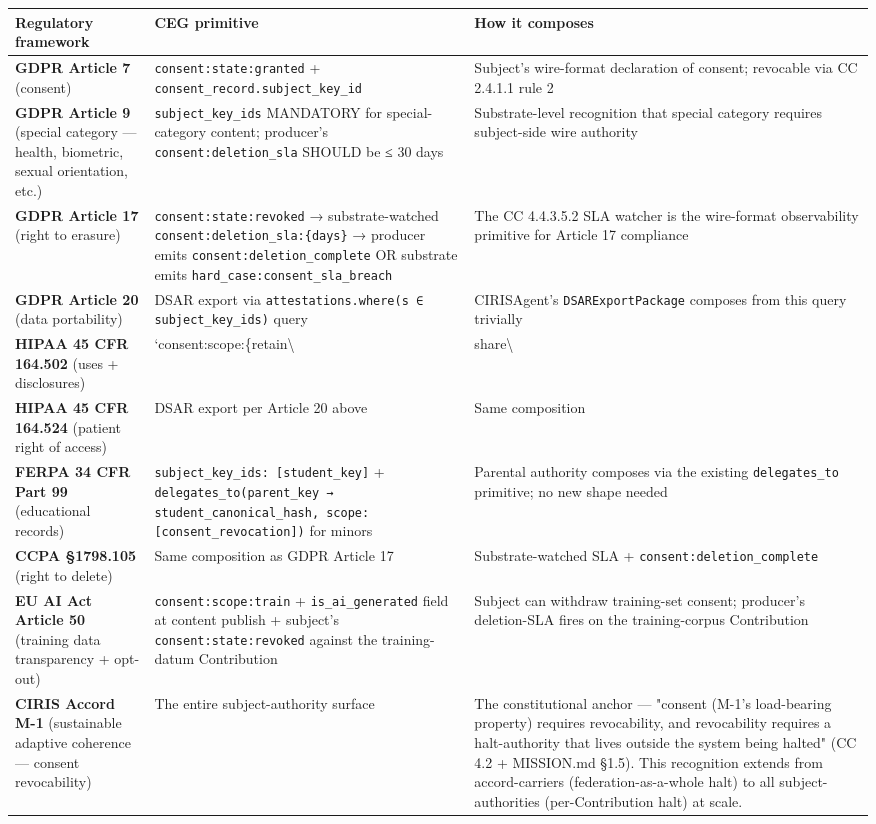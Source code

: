 \documentclass[11pt]{article}
\begin{document}
{\footnotesize
\begin{longtable}{|p{5.33cm}|p{5.33cm}|p{5.33cm}|}\hline
\textbf{Regulatory framework} & \textbf{CEG primitive} & \textbf{How it composes} \\ \hline\endhead
\textbf{GDPR Article 7} (consent) & \texttt{consent:state:granted} + \texttt{consent\_record.subject\_key\_id} & Subject's wire-format declaration of consent; revocable via CC 2.4.1.1 rule 2 \\ \hline
\textbf{GDPR Article 9} (special category — health, biometric, sexual orientation, etc.) & \texttt{subject\_key\_ids} MANDATORY for special-category content; producer's \texttt{consent:deletion\_sla} SHOULD be ≤ 30 days & Substrate-level recognition that special category requires subject-side wire authority \\ \hline
\textbf{GDPR Article 17} (right to erasure) & \texttt{consent:state:revoked} → substrate-watched \texttt{consent:deletion\_sla:\{days\}} → producer emits \texttt{consent:deletion\_complete} OR substrate emits \texttt{hard\_case:consent\_sla\_breach} & The CC 4.4.3.5.2 SLA watcher is the wire-format observability primitive for Article 17 compliance \\ \hline
\textbf{GDPR Article 20} (data portability) & DSAR export via \texttt{attestations.where(s ∈ subject\_key\_ids)} query & CIRISAgent's \texttt{DSARExportPackage} composes from this query trivially \\ \hline
\textbf{HIPAA 45 CFR 164.502} (uses + disclosures) & `consent:scope:\{retain\textbackslash{} & share\textbackslash{} \\ \hline
\textbf{HIPAA 45 CFR 164.524} (patient right of access) & DSAR export per Article 20 above & Same composition \\ \hline
\textbf{FERPA 34 CFR Part 99} (educational records) & \texttt{subject\_key\_ids: [student\_key]} + \texttt{delegates\_to(parent\_key → student\_canonical\_hash, scope: [consent\_revocation])} for minors & Parental authority composes via the existing \texttt{delegates\_to} primitive; no new shape needed \\ \hline
\textbf{CCPA §1798.105} (right to delete) & Same composition as GDPR Article 17 & Substrate-watched SLA + \texttt{consent:deletion\_complete} \\ \hline
\textbf{EU AI Act Article 50} (training data transparency + opt-out) & \texttt{consent:scope:train} + \texttt{is\_ai\_generated} field at content publish + subject's \texttt{consent:state:revoked} against the training-datum Contribution & Subject can withdraw training-set consent; producer's deletion-SLA fires on the training-corpus Contribution \\ \hline
\textbf{CIRIS Accord M-1} (sustainable adaptive coherence — consent revocability) & The entire subject-authority surface & The constitutional anchor — "consent (M-1's load-bearing property) requires revocability, and revocability requires a halt-authority that lives outside the system being halted" (CC 4.2 + MISSION.md §1.5). This recognition extends from accord-carriers (federation-as-a-whole halt) to all subject-authorities (per-Contribution halt) at scale. \\ \hline
\end{longtable}}
\end{document}
